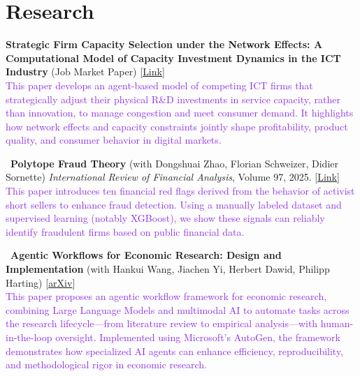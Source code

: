 \documentclass[a4paper,12pt]{article}
\begin{document}
\begin{tabularx}{\linewidth}{@{}l X@{}}

\end{tabularx}

\section{Research}

\textbullet \;\textbf{Strategic Firm Capacity Selection under the Network Effects: A Computational Model of Capacity Investment Dynamics in the ICT Industry} (Job Market Paper) [\href{https://drive.google.com/file/d/1wa6D0VgsMyzZHyDrStmR7gF94wcbUio_/view?usp=sharing}{Link}] \\ [1.5ex]
\textcolor{BlueViolet}{This paper develops an agent-based model of competing ICT firms that strategically adjust their physical R\&D investments in service capacity, rather than innovation, to manage congestion and meet consumer demand. It highlights how network effects and capacity constraints jointly shape profitability, product quality, and consumer behavior in digital markets.}

\textbullet\ \textbf{Polytope Fraud Theory} (with Dongshuai Zhao, Florian Schweizer, Didier Sornette) \textit{International Review of Financial Analysis}, Volume 97, 2025. [\href{https://www.sciencedirect.com/science/article/pii/S1057521924006665?via%3Dihub}{Link}] \\ [1.5ex]
\textcolor{BlueViolet}{This paper introduces ten financial red flags derived from the behavior of activist short sellers to enhance fraud detection. Using a manually labeled dataset and supervised learning (notably XGBoost), we show these signals can reliably identify fraudulent firms based on public financial data.}

\textbullet\ \textbf{Agentic Workflows for Economic Research: Design and Implementation} (with Hankui Wang, Jiachen Yi, Herbert Dawid, Philipp Harting) [\href{https://arxiv.org/abs/2504.09736}{arXiv}]\\ [1.5ex]
\textcolor{BlueViolet}{This paper proposes an agentic workflow framework for economic research, combining Large Language Models and multimodal AI to automate tasks across the research lifecycle—from literature review to empirical analysis—with human-in-the-loop oversight. Implemented using Microsoft’s AutoGen, the framework demonstrates how specialized AI agents can enhance efficiency, reproducibility, and methodological rigor in economic research.}
\end{document}
